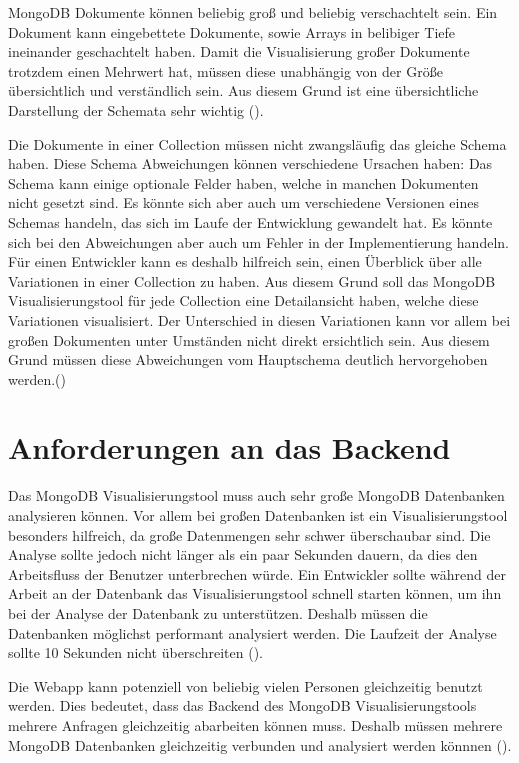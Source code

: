 MongoDB Dokumente können beliebig groß und beliebig verschachtelt sein.
Ein Dokument kann eingebettete Dokumente, sowie Arrays in belibiger Tiefe ineinander geschachtelt haben.
Damit die Visualisierung großer Dokumente trotzdem einen Mehrwert hat, müssen diese unabhängig von der Größe übersichtlich und verständlich sein.
Aus diesem Grund ist eine übersichtliche Darstellung der Schemata sehr wichtig ().

Die Dokumente in einer Collection müssen nicht zwangsläufig das gleiche Schema haben.
Diese Schema Abweichungen können verschiedene Ursachen haben:
Das Schema kann einige optionale Felder haben, welche in manchen Dokumenten nicht gesetzt sind.
Es könnte sich aber auch um verschiedene Versionen eines Schemas handeln, das sich im Laufe der Entwicklung gewandelt hat.
Es könnte sich bei den Abweichungen aber auch um Fehler in der Implementierung handeln.
Für einen Entwickler kann es deshalb hilfreich sein, einen Überblick über alle Variationen in einer Collection zu haben.
Aus diesem Grund soll das MongoDB Visualisierungstool für jede Collection eine Detailansicht haben, welche diese Variationen visualisiert.
Der Unterschied in diesen Variationen kann vor allem bei großen Dokumenten unter Umständen nicht direkt ersichtlich sein.
Aus diesem Grund müssen diese Abweichungen vom Hauptschema deutlich hervorgehoben werden.()

\section{Anforderungen an das Backend}
\label{sec:anf_backend}

Das MongoDB Visualisierungstool muss auch sehr große MongoDB Datenbanken analysieren können.
Vor allem bei großen Datenbanken ist ein Visualisierungstool besonders hilfreich, da große Datenmengen sehr schwer überschaubar sind.
Die Analyse sollte jedoch nicht länger als ein paar Sekunden dauern, da dies den Arbeitsfluss der Benutzer unterbrechen würde.
Ein Entwickler sollte während der Arbeit an der Datenbank das Visualisierungstool schnell starten können, um ihn bei der Analyse der Datenbank zu unterstützen.
Deshalb müssen die Datenbanken möglichst performant analysiert werden.
Die Laufzeit der Analyse sollte 10 Sekunden nicht überschreiten ().

Die Webapp kann potenziell von beliebig vielen Personen gleichzeitig benutzt werden.
Dies bedeutet, dass das Backend des MongoDB Visualisierungstools mehrere Anfragen gleichzeitig abarbeiten können muss.
Deshalb müssen mehrere MongoDB Datenbanken gleichzeitig verbunden und analysiert werden könnnen ().

